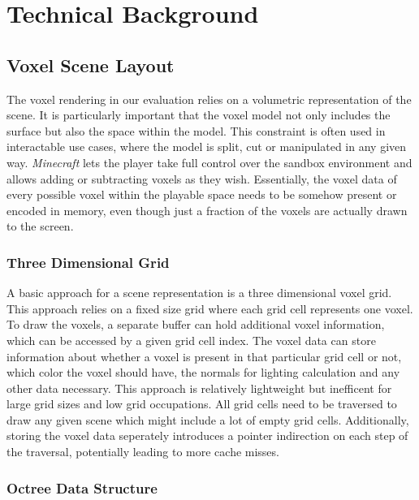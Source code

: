 \chapter{Technical Background} \label{cpt-technical-background}

\section{Voxel Scene Layout}

The voxel rendering in our evaluation relies on a volumetric representation of the scene.
It is particularly important that the voxel model not only includes the surface but also 
the space within the model. This constraint is often used in interactable use cases, where 
the model is split, cut or manipulated in any given way. \emph{Minecraft} \cite{Mojang2024}
lets the player take full control over the sandbox environment and allows adding or subtracting 
voxels as they wish. Essentially, the voxel data of every possible voxel within the playable 
space needs to be somehow present or encoded in memory, even though just a fraction of the 
voxels are actually drawn to the screen.\\

\subsection{Three Dimensional Grid} \label{subsec-three-dimensional-grid}

A basic approach for a scene representation is a three dimensional voxel grid. This 
approach relies on a fixed size grid where each grid cell represents one voxel.
To draw the voxels, a separate buffer can hold additional voxel information, which 
can be accessed by a given grid cell index. The voxel data can store information about 
whether a voxel is present in that particular grid cell or not, which color the voxel 
should have, the normals for lighting calculation and any other data necessary.
This approach is relatively lightweight but inefficent for large grid sizes and low 
grid occupations. All grid cells need to be traversed to draw any given scene which 
might include a lot of empty grid cells. Additionally, storing the voxel data seperately
introduces a pointer indirection on each step of the traversal, potentially leading to more 
cache misses.

\subsection{Octree Data Structure} \label{subsec-octree-data-structure}


